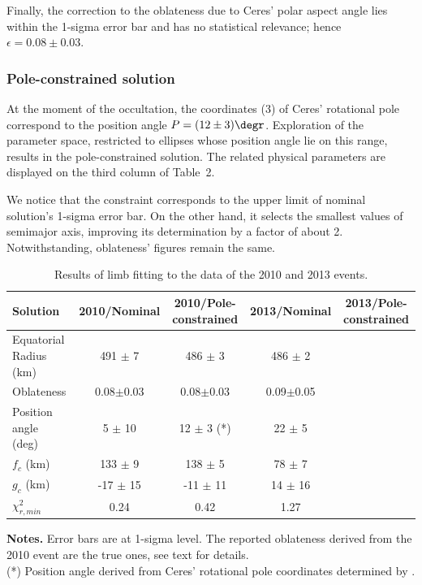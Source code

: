 \documentclass[useAMS,usenatbib]{mn2e}
\begin{document}
Finally, the correction to the oblateness due to Ceres' polar aspect angle lies within the 1-sigma error bar and has no statistical relevance; hence $\epsilon = 0.08 \pm 0.03$.





\subsubsection{Pole-constrained solution}

At the moment of the occultation, the coordinates (3) of Ceres' rotational pole correspond to the position angle $P = (12 \pm 3)\degr$. Exploration of the parameter space, restricted to ellipses whose position angle lie on this range, results in the pole-constrained solution. The related physical parameters are displayed on the third column of Table~2.

We notice that the constraint corresponds to the upper limit of nominal solution's 1-sigma error bar. On the other hand, it selects the smallest values of semimajor axis, improving its determination by a factor of about 2. Notwithstanding, oblateness' figures remain the same.

\begin{table}
 \centering
 \begin{minipage}{140mm}
  \caption{Results of limb fitting to the data of the 2010 and 2013 events.}
  \begin{tabular}{@{}lcccc}
  \hline
     Solution & 2010/Nominal & 2010/Pole-constrained & 2013/Nominal & 2013/Pole-constrained \\
\hline
Equatorial Radius (km) & 491 $\pm$ 7   & 486 $\pm$ 3   & 486 $\pm$ 2   & \\
Oblateness          & 0.08$\pm$0.03 & 0.08$\pm$0.03 & 0.09$\pm$0.05 & \\
Position angle (deg)& 5 $\pm$ 10    & 12 $\pm$ 3 (*)& 22 $\pm$ 5    &  \\
$f_c$ (km)          & 133 $\pm$ 9   & 138 $\pm$ 5   & 78 $\pm$ 7    & \\
$g_c$ (km)          & -17 $\pm$ 15  & -11 $\pm$ 11  & 14 $\pm$ 16   & \\
$\chi^2_{r,min}$    & 0.24          &  0.42         & 1.27          & \\
\hline
\end{tabular}
\textbf{Notes.} Error bars are at 1-sigma level. The reported oblateness derived from the 2010 event are the true ones, see text for details. \\
(*) Position angle derived from Ceres' rotational pole coordinates determined by \cite{Drummond2014}.
\end{minipage}
\end{table}
\end{document}
